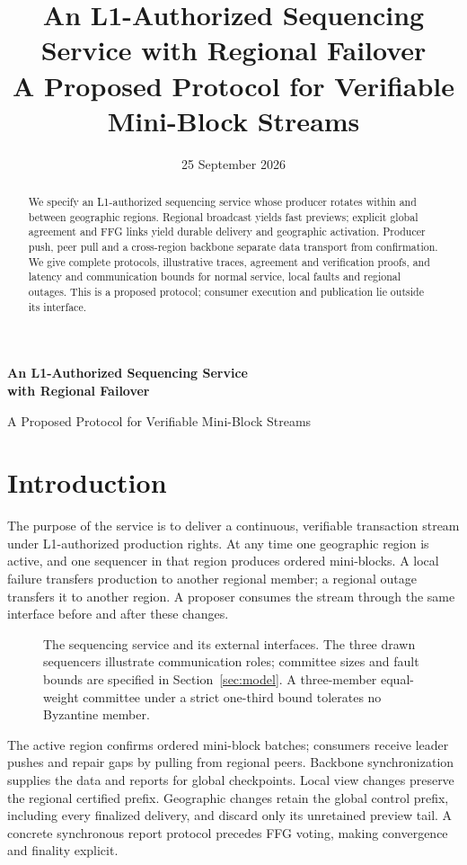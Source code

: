 \documentclass[11pt,a4paper,onecolumn]{article}
\title{An L1-Authorized Sequencing Service with Regional Failover\\
\large A Proposed Protocol for Verifiable Mini-Block Streams}
\author{}\date{25 September 2026}
\theoremstyle{remark}\newtheorem{example}[definition]{Example}
\newcounter{protocol}
\begin{document}
\begin{center}
{\Large\bfseries An L1-Authorized Sequencing Service\\with Regional Failover\par}
\vspace{.5em}
{\normalsize A Proposed Protocol for Verifiable Mini-Block Streams\par}
\vspace{.4em}{\small 25 September 2026}
\end{center}
\begin{abstract}
We specify an L1-authorized sequencing service whose producer rotates within
and between geographic regions. Regional broadcast yields fast previews;
explicit global agreement and FFG links yield durable delivery and geographic
activation. Producer push, peer pull and a cross-region backbone separate data
transport from confirmation. We give complete protocols, illustrative traces,
agreement and verification proofs, and latency and communication bounds for
normal service, local faults and regional outages. This is a proposed protocol;
consumer execution and publication lie outside its interface.
\end{abstract}

\section{Introduction}\label{sec:intro}
The purpose of the service is to deliver a continuous, verifiable transaction
stream under L1-authorized production rights. At any time one geographic region
is active, and one sequencer in that region produces ordered mini-blocks.
A local failure transfers production to another regional member; a regional
outage transfers it to another region. A proposer consumes the stream through
the same interface before and after these changes. 

\begin{figure}[H]\centering

\caption{The sequencing service and its external interfaces. The three drawn
sequencers illustrate communication roles; committee sizes and fault bounds
are specified in Section~\ref{sec:model}. A three-member equal-weight committee
under a strict one-third bound tolerates no Byzantine member.}
\label{fig:architecture}
\end{figure}

The active region confirms ordered mini-block batches; consumers receive leader
pushes and repair gaps by pulling from regional peers. Backbone synchronization
supplies the data and reports for global checkpoints. Local view changes preserve
the regional certified prefix. Geographic changes retain the global control
prefix, including every finalized delivery, and discard only its unretained
preview tail. A concrete synchronous report protocol precedes FFG voting,
making convergence and finality explicit.
\end{document}
